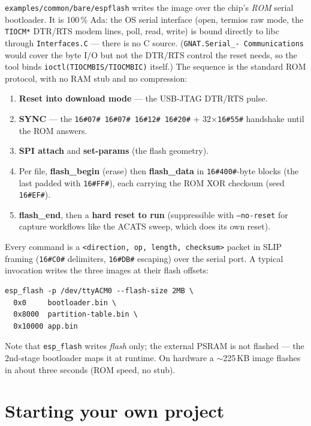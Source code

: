 \texttt{examples/common/bare/espflash} writes the image over the chip's
\emph{ROM} serial bootloader.
It is 100\,\% Ada: the OS serial interface (open, termios raw mode, the
\texttt{TIOCM*} DTR/RTS modem lines, poll, read, write) is bound directly to libc
through \texttt{Interfaces.C} --- there is no C source. (\texttt{GNAT.Serial\_-
Communications} would cover the byte I/O but not the DTR/RTS control the reset
needs, so the tool binds \texttt{ioctl(TIOCMBIS/TIOCMBIC)} itself.) The sequence
is the standard ROM protocol, with no RAM stub and no compression:

\begin{enumerate}
  \item \textbf{Reset into download mode} --- the USB-JTAG DTR/RTS pulse.
  \item \textbf{SYNC} --- the \texttt{16\#07\# 16\#07\# 16\#12\# 16\#20\#} + 32$\times$\texttt{16\#55\#}
        handshake until the ROM answers.
  \item \textbf{SPI attach} and \textbf{set-params} (the flash geometry).
  \item Per file, \textbf{flash\_begin} (erase) then \textbf{flash\_data} in
        \texttt{16\#400\#}-byte blocks (the last padded with \texttt{16\#FF\#}), each
        carrying the ROM XOR checksum (seed \texttt{16\#EF\#}).
  \item \textbf{flash\_end}, then a \textbf{hard reset to run} (suppressible with
        \texttt{--no-reset} for capture workflows like the ACATS sweep, which
        does its own reset).
\end{enumerate}

Every command is a \texttt{<direction, op, length, checksum>} packet in SLIP
framing (\texttt{16\#C0\#} delimiters, \texttt{16\#DB\#} escaping) over the serial port.
A typical invocation writes the three images at their flash offsets:

\begin{lstlisting}[style=sh]
esp_flash -p /dev/ttyACM0 --flash-size 2MB \
  0x0     bootloader.bin \
  0x8000  partition-table.bin \
  0x10000 app.bin
\end{lstlisting}

Note that \texttt{esp\_flash} writes \emph{flash} only; the external PSRAM is not
flashed --- the 2nd-stage bootloader maps it at runtime. On hardware a $\sim$225\,KB
image flashes in about three seconds (ROM speed, no stub).

\section{Starting your own project}\index{esp32-ada launcher}\index{board.ads}

